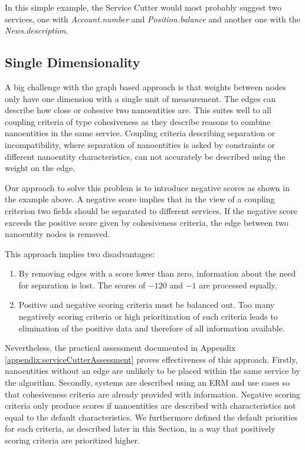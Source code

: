 In this simple example, the Service Cutter would most probably suggest two services, one with \textit{Account.number} and \textit{Position.balance} and another one with the \textit{News.description}.

\subsection{Single Dimensionality}
\label{subsec:singleDimensionality}

A big challenge with the graph based approach is that weights between nodes only have one dimension with a single unit of measurement. The edges can describe how close or cohesive two nanoentities are. This suites well to all coupling criteria of type cohesiveness as they describe reasons to combine nanoentities in the same service. Coupling criteria describing separation or incompatibility, where separation of nanoentities is asked by constraints or different nanoentity characteristics, can not accurately be described using the weight on the edge.

Our approach to solve this problem is to introduce negative scores as shown in the example above. A negative score implies that in the view of a coupling criterion two fields should be separated to different services. If the negative score exceeds the positive score given by cohesiveness criteria, the edge between two nanoentity nodes is removed. 

This approach implies two disadvantages:

\begin{enumerate}
	\item By removing edges with a score lower than zero, information  about the need for separation is lost. The scores of $-120$ and $-1$ are processed equally. 
	\item Positive and negative scoring criteria must be balanced out. Too many negatively scoring criteria or high prioritization of such criteria leads to elimination of the positive data and therefore of all information available. 
\end{enumerate}


Nevertheless, the practical assessment documented in Appendix \ref{appendix:serviceCutterAssessment} proves effectiveness of this approach. Firstly, nanoentities without an edge are unlikely to be placed within the same service by the algorithm. Secondly, systems are described using an \gls{ERM} and use cases so that cohesiveness criteria are already provided with information. Negative scoring criteria only produce scores if nanoentities are described with characteristics not equal to the default characteristics. We furthermore defined the default priorities for each criteria, as described later in this Section, in a way that positively scoring criteria are prioritized higher. 

